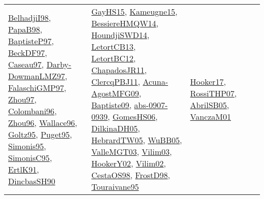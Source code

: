 {\begin{longtable}{lp{3cm}>{\raggedright}p{6cm}>{\raggedright}p{6cm}p{8cm}}
\href{articles/BelhadjiI98.pdf}{BelhadjiI98}\cite{BelhadjiI98}, \href{articles/PapaB98.pdf}{PapaB98}\cite{PapaB98}, \href{papers/BaptisteP97.pdf}{BaptisteP97}\cite{BaptisteP97}, \href{papers/BeckDF97.pdf}{BeckDF97}\cite{BeckDF97}, \href{papers/Caseau97.pdf}{Caseau97}\cite{Caseau97}, \href{articles/Darby-DowmanLMZ97.pdf}{Darby-DowmanLMZ97}\cite{Darby-DowmanLMZ97}, \href{articles/FalaschiGMP97.pdf}{FalaschiGMP97}\cite{FalaschiGMP97}, \href{articles/Zhou97.pdf}{Zhou97}\cite{Zhou97}, \href{papers/Colombani96.pdf}{Colombani96}\cite{Colombani96}, \href{papers/Zhou96.pdf}{Zhou96}\cite{Zhou96}, \href{articles/Wallace96.pdf}{Wallace96}\cite{Wallace96}, \href{papers/Goltz95.pdf}{Goltz95}\cite{Goltz95}, \href{papers/Puget95.pdf}{Puget95}\cite{Puget95}, \href{papers/Simonis95.pdf}{Simonis95}\cite{Simonis95}, \href{papers/SimonisC95.pdf}{SimonisC95}\cite{SimonisC95}, \href{papers/ErtlK91.pdf}{ErtlK91}\cite{ErtlK91}, \href{articles/DincbasSH90.pdf}{DincbasSH90}\cite{DincbasSH90} & \href{papers/GayHS15.pdf}{GayHS15}\cite{GayHS15}, \href{articles/Kameugne15.pdf}{Kameugne15}\cite{Kameugne15}, \href{papers/BessiereHMQW14.pdf}{BessiereHMQW14}\cite{BessiereHMQW14}, \href{papers/HoundjiSWD14.pdf}{HoundjiSWD14}\cite{HoundjiSWD14}, \href{papers/LetortCB13.pdf}{LetortCB13}\cite{LetortCB13}, \href{papers/LetortBC12.pdf}{LetortBC12}\cite{LetortBC12}, \href{papers/ChapadosJR11.pdf}{ChapadosJR11}\cite{ChapadosJR11}, \href{papers/ClercqPBJ11.pdf}{ClercqPBJ11}\cite{ClercqPBJ11}, \href{papers/Acuna-AgostMFG09.pdf}{Acuna-AgostMFG09}\cite{Acuna-AgostMFG09}, \href{papers/Baptiste09.pdf}{Baptiste09}\cite{Baptiste09}, \href{articles/abs-0907-0939.pdf}{abs-0907-0939}\cite{abs-0907-0939}, \href{papers/GomesHS06.pdf}{GomesHS06}\cite{GomesHS06}, \href{papers/DilkinaDH05.pdf}{DilkinaDH05}\cite{DilkinaDH05}, \href{papers/HebrardTW05.pdf}{HebrardTW05}\cite{HebrardTW05}, \href{papers/WuBB05.pdf}{WuBB05}\cite{WuBB05}, \href{papers/ValleMGT03.pdf}{ValleMGT03}\cite{ValleMGT03}, \href{papers/Vilim03.pdf}{Vilim03}\cite{Vilim03}, \href{papers/HookerY02.pdf}{HookerY02}\cite{HookerY02}, \href{papers/Vilim02.pdf}{Vilim02}\cite{Vilim02}, \href{papers/CestaOS98.pdf}{CestaOS98}\cite{CestaOS98}, \href{papers/FrostD98.pdf}{FrostD98}\cite{FrostD98}, \href{papers/Touraivane95.pdf}{Touraivane95}\cite{Touraivane95} & \href{papers/Hooker17.pdf}{Hooker17}\cite{Hooker17}, \href{papers/RossiTHP07.pdf}{RossiTHP07}\cite{RossiTHP07}, \href{papers/AbrilSB05.pdf}{AbrilSB05}\cite{AbrilSB05}, \href{papers/VanczaM01.pdf}{VanczaM01}\cite{VanczaM01}\\

\end{longtable}}
